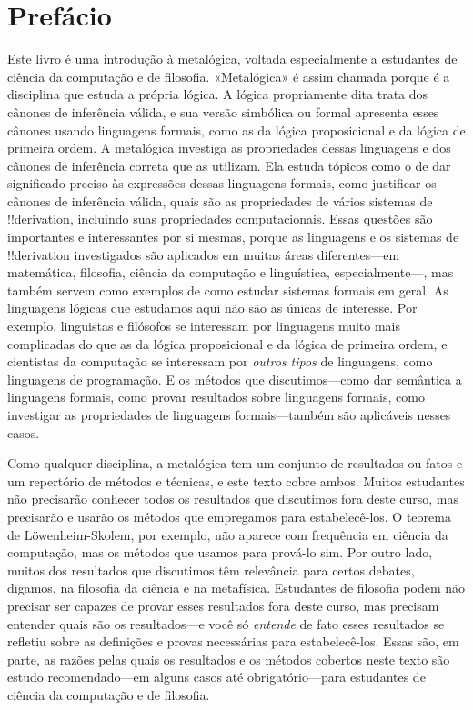 \chapter{Prefácio}

Este livro é uma introdução à metalógica, voltada especialmente a
estudantes de ciência da computação e de filosofia. «Metalógica» é
assim chamada porque é a disciplina que estuda a própria lógica. A
lógica propriamente dita trata dos cânones de inferência válida, e sua
versão simbólica ou formal apresenta esses cânones usando linguagens
formais, como as da lógica proposicional e da lógica de primeira
ordem. A metalógica investiga as propriedades dessas linguagens e dos
cânones de inferência correta que as utilizam. Ela estuda tópicos como
o de dar significado preciso às expressões dessas linguagens formais,
como justificar os cânones de inferência válida, quais são as
propriedades de vários sistemas de !!{derivation}, incluindo suas
propriedades computacionais. Essas questões são importantes e
interessantes por si mesmas, porque as linguagens e os sistemas de
!!{derivation} investigados são aplicados em muitas áreas
diferentes---em matemática, filosofia, ciência da computação e
linguística, especialmente---, mas também servem como exemplos de como
estudar sistemas formais em geral. As linguagens lógicas que estudamos
aqui não são as únicas de interesse. Por exemplo, linguistas e
filósofos se interessam por linguagens muito mais complicadas do que as
da lógica proposicional e da lógica de primeira ordem, e cientistas da
computação se interessam por \emph{outros tipos} de linguagens, como
linguagens de programação. E os métodos que discutimos---como dar
semântica a linguagens formais, como provar resultados sobre linguagens
formais, como investigar as propriedades de linguagens formais---também
são aplicáveis nesses casos.

Como qualquer disciplina, a metalógica tem um conjunto de resultados ou
fatos e um repertório de métodos e técnicas, e este texto cobre ambos.
Muitos estudantes não precisarão conhecer todos os resultados que
discutimos fora deste curso, mas precisarão e usarão os métodos que
empregamos para estabelecê-los. O teorema de Löwenheim-Skolem, por
exemplo, não aparece com frequência em ciência da computação, mas os
métodos que usamos para prová-lo sim. Por outro lado, muitos dos
resultados que discutimos têm relevância para certos debates, digamos,
na filosofia da ciência e na metafísica. Estudantes de filosofia podem
não precisar ser capazes de provar esses resultados fora deste curso,
mas precisam entender quais são os resultados---e você só
\emph{entende} de fato esses resultados se refletiu sobre as
definições e provas necessárias para estabelecê-los. Essas são, em
parte, as razões pelas quais os resultados e os métodos cobertos neste
texto são estudo recomendado---em alguns casos até obrigatório---para
estudantes de ciência da computação e de filosofia.

